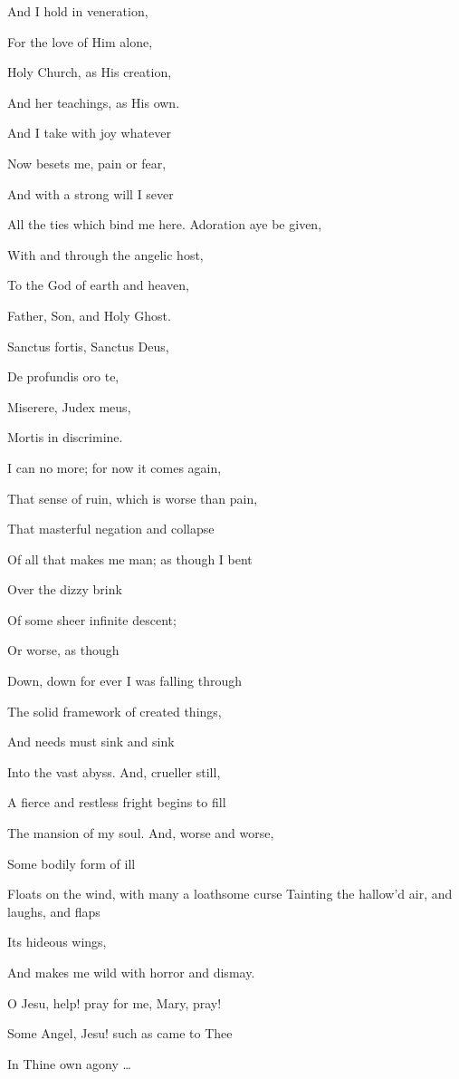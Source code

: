 And I hold in veneration,

For the love of Him alone,

Holy Church, as His creation,

And her teachings, as His own.

And I take with joy whatever

Now besets me, pain or fear,

And with a strong will I sever

All the ties which bind me here. Adoration aye be given,

With and through the angelic host,

To the God of earth and heaven,

Father, Son, and Holy Ghost.

Sanctus fortis, Sanctus Deus,

De profundis oro te,

Miserere, Judex meus,

Mortis in discrimine.

I can no more; for now it comes again,

That sense of ruin, which is worse than pain,

That masterful negation and collapse

Of all that makes me man; as though I bent

Over the dizzy brink

Of some sheer infinite descent;

Or worse, as though

Down, down for ever I was falling through

The solid framework of created things,

And needs must sink and sink

Into the vast abyss. And, crueller still,

A fierce and restless fright begins to fill

The mansion of my soul. And, worse and worse,

Some bodily form of ill

Floats on the wind, with many a loathsome curse Tainting the hallow'd air, and laughs, and flaps

Its hideous wings,

And makes me wild with horror and dismay.

O Jesu, help! pray for me, Mary, pray!

Some Angel, Jesu! such as came to Thee

In Thine own agony …

